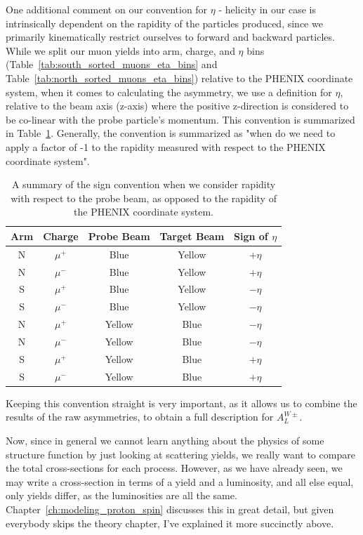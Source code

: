 One additional comment on our convention for $\eta$ - helicity in our case is
intrinsically dependent on the rapidity of the particles produced, since we
primarily kinematically restrict ourselves to forward and backward particles.
While we split our muon yields into arm, charge, and $\eta$ bins
(Table~\ref{tab:south_sorted_muons_eta_bins} and
Table~\ref{tab:north_sorted_muons_eta_bins}) relative to the PHENIX coordinate
system, when it comes to calculating the asymmetry, we use a definition for
$\eta$, relative to the beam axis (z-axis) where the positive z-direction is
considered to be co-linear with the probe particle's momentum. This convention
is summarized in Table~\ref{tab:asymmetry_rapidity_convention}. Generally, the
convention is summarized as "when do we need to apply a factor of -1 to the
rapidity measured with respect to the PHENIX coordinate system".

\begin{table}[ht]
  \centering
  \begin{tabular}{ccccc}
    \toprule
    \textbf{Arm} & 
    \textbf{Charge} &
    \textbf{Probe Beam} & 
    \textbf{Target Beam} & 
    \textbf{Sign of $\eta$} \\
    \midrule
    N & $\mu^+$ & Blue   & Yellow & $+\eta$ \\
    N & $\mu^-$ & Blue   & Yellow & $+\eta$ \\
    S & $\mu^+$ & Blue   & Yellow & $-\eta$ \\
    S & $\mu^-$ & Blue   & Yellow & $-\eta$ \\
    N & $\mu^+$ & Yellow & Blue   & $-\eta$ \\
    N & $\mu^-$ & Yellow & Blue   & $-\eta$ \\
    S & $\mu^+$ & Yellow & Blue   & $+\eta$ \\
    S & $\mu^-$ & Yellow & Blue   & $+\eta$ \\
    \bottomrule
  \end{tabular}
  \caption{
    A summary of the sign convention when we consider rapidity with respect to
    the probe beam, as opposed to the rapidity of the PHENIX coordinate system.
  }
  \label{tab:asymmetry_rapidity_convention}

\end{table}

Keeping this convention straight is very important, as it allows us to combine
the results of the raw asymmetries, to obtain a full description for
$A_L^{W\pm}$. 

Now, since in general we cannot learn anything about the physics of some
structure function by just looking at scattering yields, we really want to
compare the total cross-sections for each process. However, as we have already
seen, we may write a cross-section in terms of a yield and a luminosity, and all
else equal, only yields differ, as the luminosities are all the same.
Chapter~\ref{ch:modeling_proton_spin} discusses this in great detail, but given
everybody skips the theory chapter, I've explained it more succinctly above.


